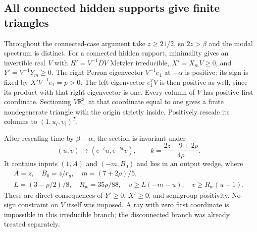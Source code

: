\subsection{All connected hidden supports give finite triangles}
Throughout the connected-case argument take $z\ge21/2$, so $2z>\beta$ and the modal spectrum is distinct. For a connected hidden support, minimality gives an invertible real $V$ with $H'=V^{-1}DV$ Metzler irreducible, $X'=X_mV\ge0$, and $Y'=V^{-1}Y_m\ge0$. The right Perron eigenvector $V^{-1}e_1$ at $-\alpha$ is positive: its sign is fixed by $X'V^{-1}e_1=p>0$. The left eigenvector $e_1^TV$ is then positive as well, since its product with that right eigenvector is one. Every column of $V$ has positive first coordinate. Sectioning $V\mathbb R_+^3$ at that coordinate equal to one gives a finite nondegenerate triangle with the origin strictly inside. Positively rescale its columns to $(1,u_i,v_i)^T$.

After rescaling time by $\beta-\alpha$, the section is invariant under
\begin{equation}
 (u,v)\mapsto(e^{-t}u,e^{-kt}v),\qquad
 k=\frac{2z-9+2\rho}{4\rho}.\label{eq:flow}
\end{equation}
It contains inputs $(1,A)$ and $(-m,B_0)$ and lies in an output wedge, where
\begin{gather}
 A=z,\quad B_0=z/r_y,\quad m=(7+2\rho)/5,\\
 L=(3-\rho/2)/8,\quad R_w=35\rho/88,\quad
 v\ge L(-m-u),\quad v\ge R_w(u-1).\label{eq:wedge}
\end{gather}
These are direct consequences of $Y'\ge0$, $X'\ge0$, and semigroup positivity. No sign constraint on $V$ itself was imposed. A ray with zero first coordinate is impossible in this irreducible branch; the disconnected branch was already treated separately.

